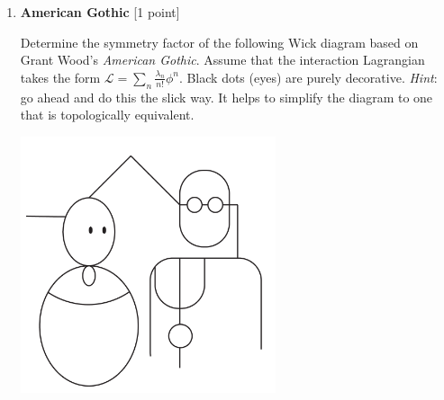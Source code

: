 \documentclass[12pt]{article}
\begin{document}
\begin{enumerate}
\vspace*{0.5cm}



\item  {\bf American Gothic} [1 point]

Determine the symmetry factor of the following Wick diagram based on Grant Wood's \textit{American Gothic}. Assume that the interaction Lagrangian takes the form $\mathcal{L} =\sum_n \frac{\lambda_n}{n!} \phi^n$.
Black dots (eyes) are purely decorative. \textit{Hint}: go ahead and do this the slick way. It helps to simplify the diagram to one that is topologically equivalent.

\begin{center}
\includegraphics[width=7.5cm]{AmericanGothic}
\end{center}



\end{enumerate}
\end{document}
